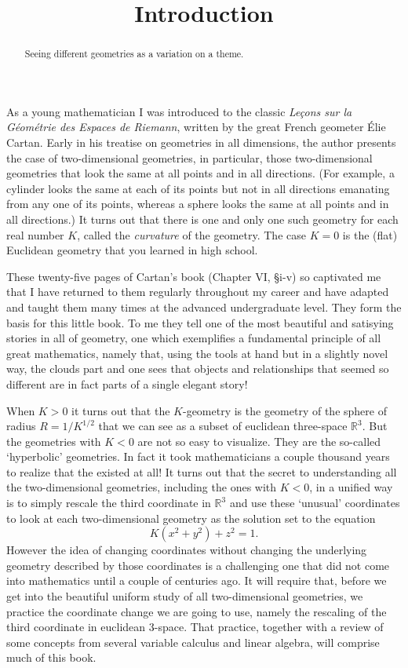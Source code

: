 \documentclass[handout]{ximera}
\title{Introduction}
\begin{document}
\begin{abstract}
Seeing different geometries as a variation on a theme.
\end{abstract}
\maketitle

As a young mathematician I was introduced to the classic \textit{Le\c{c}ons
sur la G\'{e}om\'{e}trie des Espaces de Riemann}, written by the great French
geometer \'{E}lie Cartan. Early in his treatise on geometries in all
dimensions, the author presents the case of two-dimensional geometries, in
particular, those two-dimensional geometries that look the same at all points
and in all directions. (For example, a cylinder looks the same at each of its
points but not in all directions emanating from any one of its points, whereas
a sphere looks the same at all points and in all directions.) It turns out
that there is one and only one such geometry for each real number $K$, called
the \textit{curvature} of the geometry. The case $K=0$ is the (flat) Euclidean
geometry that you learned in high school.

These twenty-five pages of Cartan's book (Chapter VI, \S i-v) so captivated me
that I have returned to them regularly throughout my career and have adapted
and taught them many times at the advanced undergraduate level. They form the
basis for this little book. To me they tell one of the most beautiful and
satisying stories in all of geometry, one which exemplifies a fundamental
principle of all great mathematics, namely that, using the tools at hand but
in a slightly novel way, the clouds part and one sees that objects and
relationships that seemed so different are in fact parts of a single elegant story!

When $K>0$ it turns out that the $K$-geometry is the geometry of the sphere of
radius $R=1/K^{1/2}$ that we can see as a subset of euclidean three-space
$\mathbb{R}^{3}$. But the geometries with $K<0$ are not so easy to
visualize. They are the so-called `hyperbolic' geometries. In fact it took
mathematicians a couple thousand years to realize that the existed at all! It
turns out that the secret to understanding all the two-dimensional geometries,
including the ones with $K<0$, in a unified way is to simply rescale the third
coordinate in $\mathbb{R}^{3}$ and use these `unusual' coordinates to look at each two-dimensional geometry as the solution set
to the equation%
\[
K\left(  x^{2}+y^{2}\right)  +z^{2}=1.
\]
However the idea of changing coordinates without changing the underlying
geometry described by those coordinates is a challenging one that did not come
into mathematics until a couple of centuries ago. It will require that, before
we get into the beautiful uniform study of all two-dimensional geometries, we
practice the coordinate change we are going to use, namely the rescaling of
the third coordinate in euclidean $3$-space. That practice, together with a
review of some concepts from several variable calculus and linear algebra,
will comprise much of this book.
\end{document}
